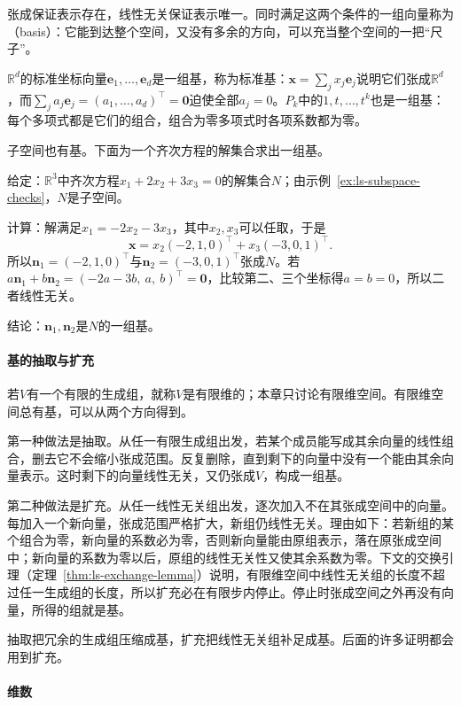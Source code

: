 张成保证表示存在，线性无关保证表示唯一。同时满足这两个条件的一组向量称为（basis）：它能到达整个空间，又没有多余的方向，可以充当整个空间的一把“尺子”。

$\mathbb R^d$的标准坐标向量$\bm e_1,\ldots,\bm e_d$是一组基，称为标准基：$\bm x=\sum_jx_j\bm e_j$说明它们张成$\mathbb R^d$，而$\sum_ja_j\bm e_j=(a_1,\ldots,a_d)^\top=\bm0$迫使全部$a_j=0$。$P_k$中的$1,t,\ldots,t^k$也是一组基：每个多项式都是它们的组合，组合为零多项式时各项系数都为零。

子空间也有基。下面为一个齐次方程的解集合求出一组基。
\begin{example}[齐次方程解平面的一组基]
\label{ex:ls-solution-plane-basis}
给定：$\mathbb R^3$中齐次方程$x_1+2x_2+3x_3=0$的解集合$N$；由示例~\ref{ex:ls-subspace-checks}，$N$是子空间。

计算：解满足$x_1=-2x_2-3x_3$，其中$x_2,x_3$可以任取，于是
\[
 \bm x=x_2(-2,1,0)^\top+x_3(-3,0,1)^\top .
\]
所以$\bm n_1=(-2,1,0)^\top$与$\bm n_2=(-3,0,1)^\top$张成$N$。若$a\bm n_1+b\bm n_2=(-2a-3b,\ a,\ b)^\top=\bm0$，比较第二、三个坐标得$a=b=0$，所以二者线性无关。

结论：$\bm n_1,\bm n_2$是$N$的一组基。
\end{example}

\paragraph{基的抽取与扩充}
若$V$有一个有限的生成组，就称$V$是有限维的；本章只讨论有限维空间。有限维空间总有基，可以从两个方向得到。

第一种做法是抽取。从任一有限生成组出发，若某个成员能写成其余向量的线性组合，删去它不会缩小张成范围。反复删除，直到剩下的向量中没有一个能由其余向量表示。这时剩下的向量线性无关，又仍张成$V$，构成一组基。

第二种做法是扩充。从任一线性无关组出发，逐次加入不在其张成空间中的向量。每加入一个新向量，张成范围严格扩大，新组仍线性无关。理由如下：若新组的某个组合为零，新向量的系数必为零，否则新向量能由原组表示，落在原张成空间中；新向量的系数为零以后，原组的线性无关性又使其余系数为零。下文的交换引理（定理~\ref{thm:ls-exchange-lemma}）说明，有限维空间中线性无关组的长度不超过任一生成组的长度，所以扩充必在有限步内停止。停止时张成空间之外再没有向量，所得的组就是基。

抽取把冗余的生成组压缩成基，扩充把线性无关组补足成基。后面的许多证明都会用到扩充。

\paragraph{维数}
\label{sec:ls-dimension}


